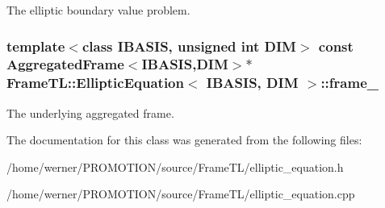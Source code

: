 The elliptic boundary value problem. \hypertarget{classFrameTL_1_1EllipticEquation_c6cfc9f98e124563a81a3e1da08de95e}{
\subsubsection[frame\_\-]{\setlength{\rightskip}{0pt plus 5cm}template$<$class IBASIS, unsigned int DIM$>$ const {\bf AggregatedFrame}$<$IBASIS,DIM$>$$\ast$ {\bf FrameTL::EllipticEquation}$<$ IBASIS, DIM $>$::{\bf frame\_\-}}}
\label{classFrameTL_1_1EllipticEquation_c6cfc9f98e124563a81a3e1da08de95e}


The underlying aggregated frame. 

The documentation for this class was generated from the following files:\begin{CompactItemize}
\item 
/home/werner/PROMOTION/source/FrameTL/elliptic\_\-equation.h\item 
/home/werner/PROMOTION/source/FrameTL/elliptic\_\-equation.cpp\end{CompactItemize}
